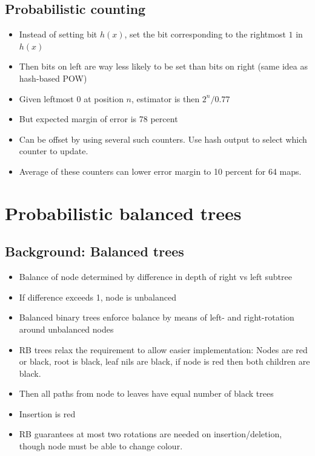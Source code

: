 \documentclass[a4paper]{scrreprt}
\begin{document}
\subsection{Probabilistic counting}

\begin{itemize}
		\item Instead of setting bit $h(x)$, set the bit corresponding to the rightmost $1$ in $h(x)$
		\item Then bits on left are way less likely to be set than bits on right (same idea as hash-based POW)
		\item Given leftmost $0$ at position $n$, estimator is then $2^n/0.77$
		\item But expected margin of error is 78 percent
		\item Can be offset by using several such counters. Use hash output to select which counter to update.
		\item Average of these counters can lower error margin to 10 percent for 64 maps.
\end{itemize}

\section{Probabilistic balanced trees}

\subsection{Background: Balanced trees}

\begin{itemize}
		\item Balance of node determined by difference in depth of right vs
				left subtree
		\item If difference exceeds 1, node is unbalanced
		\item Balanced binary trees enforce balance by means of left- and
				right-rotation around unbalanced nodes
		\item RB trees relax the requirement to allow easier implementation:
				Nodes are red or black, root is black, leaf nils are black, if
				node is red then both children are black.
		\item Then all paths from node to leaves have equal number of black
				trees
		\item Insertion is red
		\item RB guarantees at most two rotations are needed on
				insertion/deletion, though node must be able to change colour.
\end{itemize}
\end{document}

